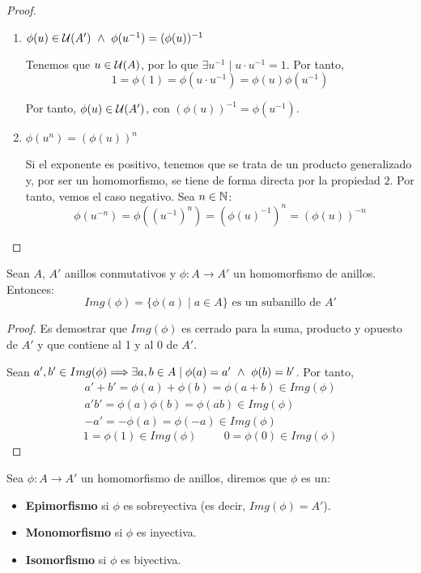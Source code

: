 \begin{proof}
\begin{enumerate}
    \item $\phi(u) \in \mathcal{U}(A') \ \land \  \phi(u^{-1}) = (\phi(u))^{-1}$

    Tenemos que $u \in \mathcal{U}(A)$, por lo que $\exists u^{-1} \mid u \cdot u^{-1} = 1$. Por tanto,
    $$1 = \phi(1) = \phi(u \cdot u^{-1}) = \phi(u) \phi(u^{-1})$$

    Por tanto, $\phi(u) \in \mathcal{U}(A')$, con $(\phi(u))^{-1} = \phi(u^{-1})$.
    
    \item $\phi(u^n) = (\phi(u))^n$

    Si el exponente es positivo, tenemos que se trata de un producto generalizado y, por ser un homomorfismo, se tiene de forma directa por la propiedad $2$. Por tanto, vemos el caso negativo. Sea $n \in \mathbb N$:
    $$\phi(u^{-n}) = \phi((u^{-1})^n) = (\phi(u)^{-1})^n = (\phi(u))^{-n}$$
    
\end{enumerate}
\end{proof}

\begin{prop}
    \label{prop:ImagenHomomorfismo}
    Sean $A$, $A'$ anillos conmutativos y $\phi:A \longrightarrow A'$ un homomorfismo de anillos. Entonces:
    $$Img(\phi) = \{\phi(a) \mid a \in A\} \mbox{ es un subanillo de } A'$$
\end{prop}
\begin{proof}
    Es demostrar que $Img(\phi)$ es cerrado para la suma, producto y opuesto de $A'$ y que contiene al 1 y al 0 de $A'$.
    
    Sean $a',b' \in Img(\phi) \Longrightarrow \exists a,b \in A \mid \phi(a) = a' \ \land \  \phi(b) = b'$. Por tanto,
    \begin{gather*}
        a'+b' = \phi(a)+\phi(b) = \phi(a+b) \in Img(\phi) \\
        a'b' = \phi(a)\phi(b) = \phi(ab) \in Img(\phi) \\
        -a' = -\phi(a) = \phi(-a) \in Img(\phi)
    \end{gather*}
    $$1 = \phi(1) \in Img(\phi) \hspace{1cm} 0 = \phi(0) \in Img(\phi)$$
\end{proof}

\begin{definicion}
    Sea $\phi:A\longrightarrow A'$ un homomorfismo de anillos, diremos que $\phi$ es un:
    \begin{itemize}
        \item \textbf{Epimorfismo} si $\phi$ es sobreyectiva (es decir, $Img(\phi)=A'$).
        \item \textbf{Monomorfismo} si $\phi$ es inyectiva.
        \item \textbf{Isomorfismo} si $\phi$ es biyectiva.
    \end{itemize}
\end{definicion}

